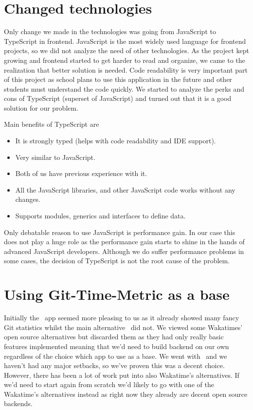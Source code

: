 \section{Changed technologies}\label{sec:changed-technologies}
Only change we made in the technologies was going from JavaScript to TypeScript in frontend.
JavaScript is the most widely used language for frontend projects, so we did not analyze the need of other technologies.
As the project kept growing and frontend started to get harder to read and organize, we came to the realization that better solution is needed.
Code readability is very important part of this project as school plans to use this application in the future and other students must understand the code quickly.
We started to analyze the perks and cons of TypeScript (superset of JavaScript) and turned out that it is a good solution for our problem.

Main benefits of TypeScript are
\begin{itemize}
    \item It is strongly typed (helps with code readability and IDE support).
    \item Very similar to JavaScript.
    \item Both of us have previous experience with it.
    \item All the JavaScript libraries, and other JavaScript code works without any changes.
    \item Supports modules, generics and interfaces to define data.
\end{itemize}

Only debatable reason to use JavaScript is performance gain.
In our case this does not play a huge role as the performance gain starts to shine in the hands of advanced JavaScript developers.
Although we do suffer performance problems in some cases, the decision of TypeScript is not the root cause of the problem.

\section{Using Git-Time-Metric as a base}\label{sec:using-git-time-metric-base}
Initially the~ app seemed more pleasing to us as it already showed many fancy Git statistics whilst
the main alternative~ did not.
We viewed some Wakatimes' open source alternatives but discarded them as they had only really basic features implemented meaning that
we'd need to build backend on our own regardless of the choice which app to use as a base.
We went with~ and we haven't had any major setbacks, so we've proven this was a decent choice.
However, there has been a lot of work put into also Wakatime's alternatives.
If we'd need to start again from scratch we'd likely to go with one of the Wakatime's alternatives instead as right now
they already are decent open source backends.

